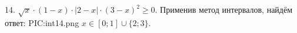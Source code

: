 14. $\sqrt{x}\cdot(1-x)\cdot|2-x|\cdot(3-x)^2\geqslant0.$
Применив метод интервалов, найдём ответ:
{{PIC:int14.png}}
$x\in[0;1]\cup\{2; 3\}.$\\
